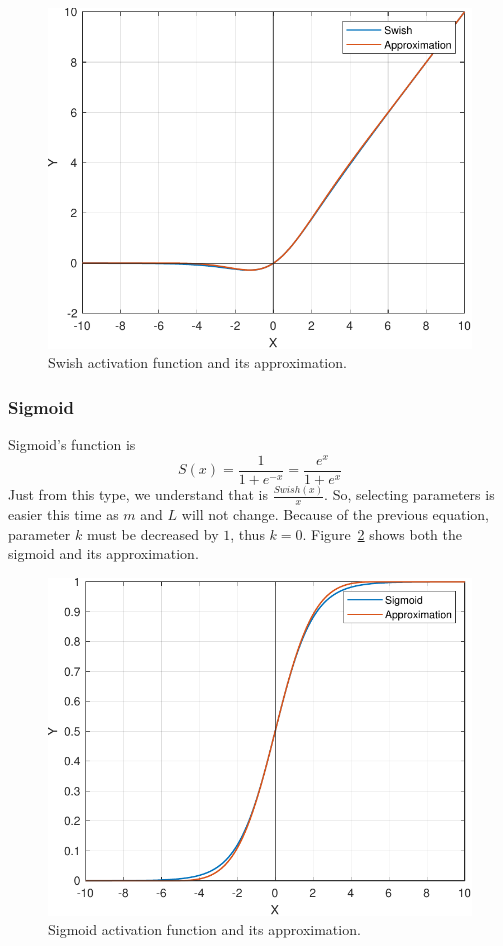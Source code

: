 \begin{figure}[H]
	\centering
	\includegraphics[width=.5\textwidth]{../Problem 7/prob7_swish.pdf}
	\caption{Swish activation function and its approximation.}
	\label{fig:prob7_swish}
\end{figure}

\subsubsection{Sigmoid}
Sigmoid's function is 
\[
S(x) = \dfrac{1}{1+e^{-x}} = \dfrac{e^x}{1+e^x}
\]
Just from this type, we understand that is $\frac{Swish(x)}{x}$. So, selecting parameters is easier this time as $m$ and $L$ will not change. Because of the previous equation, parameter $k$ must be decreased by $1$, thus $k=0$. Figure~\ref{fig:prob7_sigmoid} shows both the sigmoid and its approximation.

\begin{figure}[H]
	\centering
	\includegraphics[width=.5\textwidth]{../Problem 7/prob7_sigmoid.pdf}
	\caption{Sigmoid activation function and its approximation.}
	\label{fig:prob7_sigmoid}
\end{figure}



